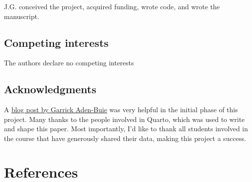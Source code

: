 \documentclass[
]{agujournal2019}
\begin{document}
J.G. conceived the project, acquired funding, wrote code, and wrote the
manuscript.

\hypertarget{competing-interests}{%
\subsection*{Competing interests}\label{competing-interests}}

The authors declare no competing interests

\hypertarget{acknowledgments}{%
\subsection*{Acknowledgments}\label{acknowledgments}}

A
\href{https://www.garrickadenbuie.com/blog/use-google-forms-and-r-to-track-data-easily/}{blog
post by Garrick Aden-Buie} was very helpful in the initial phase of this
project. Many thanks to the people involved in Quarto, which was used to
write and shape this paper. Most importantly, I'd like to thank all
students involved in the course that have generously shared their data,
making this project a success.

\hypertarget{references}{%
\section*{References}\label{references}}
\end{document}
